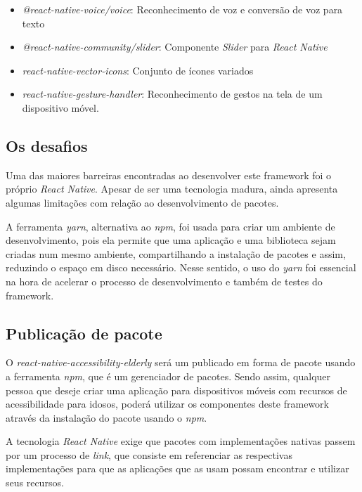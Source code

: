 \documentclass[
	12pt,				    %
	openright,			    %
	oneside,			    %
	a4paper,			    %
    sumario=tradicional,    %
	english,			    %
	brazil,				    %
	]{abntex2}              %
\begin{document}
\begin{itemize}
	\item \textit{@react-native-voice/voice}: Reconhecimento de voz e conversão de voz para texto
	\item \textit{@react-native-community/slider}: Componente \textit{Slider} para \textit{React Native}
	\item \textit{react-native-vector-icons}: Conjunto de ícones variados
	\item \textit{react-native-gesture-handler}: Reconhecimento de gestos na tela de um dispositivo móvel.
\end{itemize}

\subsection{Os desafios}

Uma das maiores barreiras encontradas ao desenvolver este framework foi o próprio \textit{React Native}. Apesar de ser uma tecnologia madura, ainda apresenta algumas limitações com relação ao desenvolvimento de pacotes.

\par

A ferramenta \textit{yarn}, alternativa ao \textit{npm}, foi usada para criar um ambiente de desenvolvimento, pois ela permite que uma aplicação e uma biblioteca sejam criadas num mesmo ambiente, compartilhando a instalação de pacotes e assim, reduzindo o espaço em disco necessário. Nesse sentido, o uso do \textit{yarn} foi essencial na hora de acelerar o processo de desenvolvimento e também de testes do framework.

\subsection{Publicação de pacote}

O \textit{react-native-accessibility-elderly} será um publicado em forma de pacote usando a ferramenta \textit{npm}, que é um gerenciador de pacotes. Sendo assim, qualquer pessoa que deseje criar uma aplicação para dispositivos móveis com recursos de acessibilidade para idosos, poderá utilizar os componentes deste framework através da instalação do pacote usando o \textit{npm}.

A tecnologia \textit{React Native} exige que pacotes com implementações nativas passem por um processo de \textit{link}, que consiste em referenciar as respectivas implementações para que as aplicações que as usam possam encontrar e utilizar seus recursos.
\end{document}
